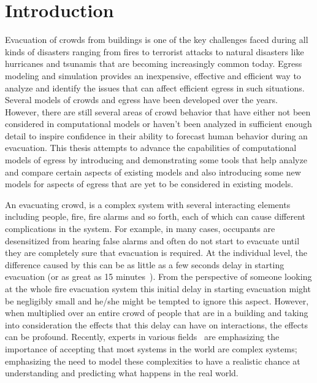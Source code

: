 
\chapter{Introduction}
\label{chapter:Introduction}





Evacuation of crowds from buildings is one of the key challenges faced during all kinds of disasters ranging from fires to terrorist attacks to natural disasters like hurricanes and tsunamis that are becoming increasingly common today. Egress modeling and simulation provides an inexpensive, effective and efficient way to analyze and identify the issues that can affect efficient egress in such situations. Several models of crowds and egress have been developed over the years. However, there are still several areas of crowd behavior that have either not been considered in computational models or haven't been analyzed in sufficient enough detail to inspire confidence in their ability to forecast human behavior during an evacuation. This thesis attempts to advance the capabilities of computational models of egress by introducing and demonstrating some tools that help analyze and compare certain aspects of existing models and also introducing some new models for aspects of egress that are yet to be considered in existing models. 


An evacuating crowd, is a complex system with several interacting elements including people, fire, fire alarms and so forth, each of which can cause different complications in the system.  For example, in many cases, occupants are desensitized from hearing false alarms and often do not start to evacuate until they are completely sure that evacuation is required. At the individual level, the difference caused by this can be as little as a few seconds delay in starting evacuation (or as great as 15 minutes~\cite{FIND_PAPER}). From the perspective of someone looking at the whole fire evacuation system this initial delay in starting evacuation might be negligibly small and he/she might be tempted to ignore this aspect. However, when multiplied over an entire crowd of people that are in a building and taking into consideration the effects that this delay can have on interactions, the effects can be profound. 
Recently, experts in various fields~\cite{Arthur:2010uy} are emphasizing the importance of accepting that most systems in the world are complex systems; emphasizing the need to model these complexities to have a realistic chance at understanding and predicting what happens in the real world. 


